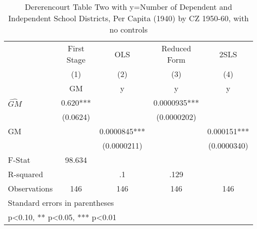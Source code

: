 \begin{table}[htbp]\centering
\def\sym#1{\ifmmode^{#1}\else\(^{#1}\)\fi}
\caption{Dererencourt Table Two with y=Number of Dependent and Independent School Districts, Per Capita (1940) by CZ 1950-60, with no controls}
\begin{tabular}{l*{4}{c}}
\toprule
                    & First Stage   &         OLS   &Reduced Form   &        2SLS   \\
                    &\multicolumn{1}{c}{(1)}&\multicolumn{1}{c}{(2)}&\multicolumn{1}{c}{(3)}&\multicolumn{1}{c}{(4)}\\
                    &\multicolumn{1}{c}{GM}&\multicolumn{1}{c}{y}&\multicolumn{1}{c}{y}&\multicolumn{1}{c}{y}\\
\midrule
$\hat{GM}$          &       0.620***&               &   0.0000935***&               \\
                    &    (0.0624)   &               & (0.0000202)   &               \\
\addlinespace
GM                  &               &   0.0000845***&               &    0.000151***\\
                    &               & (0.0000211)   &               & (0.0000340)   \\
\midrule
F-Stat              &      98.634   &               &               &               \\
R-squared           &               &          .1   &        .129   &               \\
Observations        &         146   &         146   &         146   &         146   \\
\bottomrule
\multicolumn{5}{l}{\footnotesize Standard errors in parentheses}\\
\multicolumn{5}{l}{\footnotesize * p<0.10, ** p<0.05, *** p<0.01}\\
\end{tabular}
\end{table}
